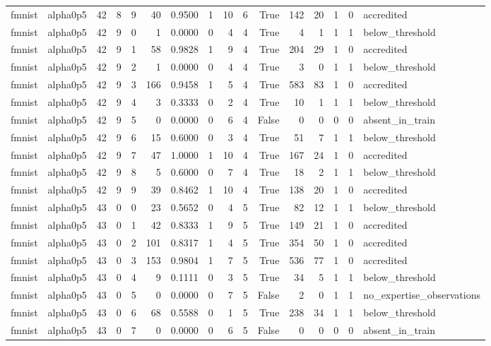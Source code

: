 \begin{tabular}{llrrrrrrrrrrrrrl}
fmnist & alpha0p5 & 42 & 8 & 9 & 40 & 0.9500 & 1 & 10 & 6 & True & 142 & 20 & 1 & 0 & accredited \\
fmnist & alpha0p5 & 42 & 9 & 0 & 1 & 0.0000 & 0 & 4 & 4 & True & 4 & 1 & 1 & 1 & below\_threshold \\
fmnist & alpha0p5 & 42 & 9 & 1 & 58 & 0.9828 & 1 & 9 & 4 & True & 204 & 29 & 1 & 0 & accredited \\
fmnist & alpha0p5 & 42 & 9 & 2 & 1 & 0.0000 & 0 & 4 & 4 & True & 3 & 0 & 1 & 1 & below\_threshold \\
fmnist & alpha0p5 & 42 & 9 & 3 & 166 & 0.9458 & 1 & 5 & 4 & True & 583 & 83 & 1 & 0 & accredited \\
fmnist & alpha0p5 & 42 & 9 & 4 & 3 & 0.3333 & 0 & 2 & 4 & True & 10 & 1 & 1 & 1 & below\_threshold \\
fmnist & alpha0p5 & 42 & 9 & 5 & 0 & 0.0000 & 0 & 6 & 4 & False & 0 & 0 & 0 & 0 & absent\_in\_train \\
fmnist & alpha0p5 & 42 & 9 & 6 & 15 & 0.6000 & 0 & 3 & 4 & True & 51 & 7 & 1 & 1 & below\_threshold \\
fmnist & alpha0p5 & 42 & 9 & 7 & 47 & 1.0000 & 1 & 10 & 4 & True & 167 & 24 & 1 & 0 & accredited \\
fmnist & alpha0p5 & 42 & 9 & 8 & 5 & 0.6000 & 0 & 7 & 4 & True & 18 & 2 & 1 & 1 & below\_threshold \\
fmnist & alpha0p5 & 42 & 9 & 9 & 39 & 0.8462 & 1 & 10 & 4 & True & 138 & 20 & 1 & 0 & accredited \\
fmnist & alpha0p5 & 43 & 0 & 0 & 23 & 0.5652 & 0 & 4 & 5 & True & 82 & 12 & 1 & 1 & below\_threshold \\
fmnist & alpha0p5 & 43 & 0 & 1 & 42 & 0.8333 & 1 & 9 & 5 & True & 149 & 21 & 1 & 0 & accredited \\
fmnist & alpha0p5 & 43 & 0 & 2 & 101 & 0.8317 & 1 & 4 & 5 & True & 354 & 50 & 1 & 0 & accredited \\
fmnist & alpha0p5 & 43 & 0 & 3 & 153 & 0.9804 & 1 & 7 & 5 & True & 536 & 77 & 1 & 0 & accredited \\
fmnist & alpha0p5 & 43 & 0 & 4 & 9 & 0.1111 & 0 & 3 & 5 & True & 34 & 5 & 1 & 1 & below\_threshold \\
fmnist & alpha0p5 & 43 & 0 & 5 & 0 & 0.0000 & 0 & 7 & 5 & False & 2 & 0 & 1 & 1 & no\_expertise\_observations \\
fmnist & alpha0p5 & 43 & 0 & 6 & 68 & 0.5588 & 0 & 1 & 5 & True & 238 & 34 & 1 & 1 & below\_threshold \\
fmnist & alpha0p5 & 43 & 0 & 7 & 0 & 0.0000 & 0 & 6 & 5 & False & 0 & 0 & 0 & 0 & absent\_in\_train \\

\end{tabular}
